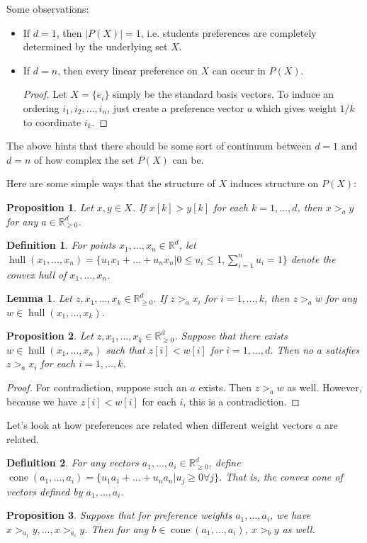\documentclass[12pt]{article}
\newtheorem*{definition}{Definition}
\newtheorem*{proposition}{Proposition}
\newtheorem*{lemma}{Lemma}
\newcommand{\R}{\mathbb{R}}
\newcommand{\Rgz}{\mathbb{R}_{\ge 0}}
\DeclareMathOperator*{\cone}{cone}
\DeclareMathOperator*{\hull}{hull}
\newcommand{\1}[1]{\mathds{1}[{#1}]}
\begin{document}
  Some observations:
  \begin{itemize}
    \item If $d=1$, then $|P(X)| = 1$, i.e. students preferences are completely
      determined by the underlying set $X$.
    \item If $d=n$, then every linear preference on $X$ can occur in $P(X)$.
      \begin{proof}
        Let $X = \{e_i\}$ simply be the standard basis vectors.
        To induce an ordering $i_1, i_2, \ldots, i_n$, just create a preference
        vector $a$ which gives weight $1/k$ to coordinate $i_k$.
      \end{proof}
  \end{itemize}
  The above hints that there should be some sort of continuum between $d=1$
  and $d=n$ of how complex the set $P(X)$ can be.

  Here are some simple ways that the structure of $X$ induces structure on $P(X)$:
  \begin{proposition}
    Let $x,y \in X$. If $x[k] > y[k]$ for each $k=1,\ldots,d$, then
    $x >_a y$ for any $a\in \Rgz^d$.
  \end{proposition}
  \begin{definition}
    For points $x_1,\ldots,x_n \in \R^d$, let $\hull(x_1,\ldots,x_n)
    = \{u_1x_1 + \ldots + u_nx_n | 0\le u_i\le 1, \sum_{i=1}^n u_i = 1\}$
    denote the convex hull of $x_1,\ldots,x_n$.
  \end{definition}
  \begin{lemma}
    Let $z,x_1,\ldots,x_k \in \Rgz^d$.
    If $z >_a x_i$ for $i=1,\ldots,k$, then $z >_a w$
    for any $w\in \hull(x_1,\ldots,x_k)$.
  \end{lemma}
  \begin{proposition}
    Let $z,x_1,\ldots,x_k \in \Rgz^d$.
    Suppose that there exists $w\in \hull(x_1,\ldots,x_n)$
    such that $z[i] < w[i]$ for $i=1,\ldots,d$.
    Then no $a$ satisfies $z >_a x_i$ for each $i=1,\ldots, k$.
  \end{proposition}
  \begin{proof}
    For contradiction, suppose such an $a$ exists.
    Then $z >_a w$ as well. However, because we have $z[i] < w[i]$
    for each $i$, this is a contradiction.
  \end{proof}

  Let's look at how preferences are related when different weight vectors $a$
  are related.
  \begin{definition}
    For any vectors $a_1,\ldots, a_i \in \Rgz^d$, define
    $\cone(a_1,\ldots,a_i) = \{ u_1a_1 + \ldots + u_na_n | u_j\ge 0 \forall j\}$.
    That is, the convex cone of vectors defined by $a_1,\ldots,a_i$.
  \end{definition}
  \begin{proposition}
    Suppose that for preference weights $a_1,\ldots, a_i$,
    we have $x >_{a_1} y, \ldots, x >_{a_i} y$.
    Then for any $b\in \cone(a_1,\ldots, a_i)$,
    $x >_b y$ as well.
  \end{proposition}
\end{document}
